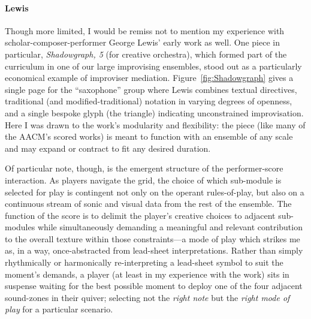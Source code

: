     \paragraph{Lewis}
        
    Though more limited, I would be remiss not to mention my experience with scholar-composer-performer George Lewis' early work as well. One piece in particular, \textit{Shadowgraph, 5} (for creative orchestra), which formed part of the curriculum in one of our large improvising ensembles, stood out as a particularly economical example of improviser mediation. Figure~\ref{fig:Shadowgraph} gives a single page for the ``saxophone'' group where Lewis combines textual directives, traditional (and modified-traditional) notation in varying degrees of openness, and a single bespoke glyph (the triangle) indicating unconstrained improvisation. Here I was drawn to the work's modularity and flexibility: the piece (like many of the AACM's scored works) is meant to function with an ensemble of any scale and may expand or contract to fit any desired duration. 
    
    Of particular note, though, is the emergent structure of the performer-score interaction. As players navigate the grid, the choice of which sub-module is selected for play is contingent not only on the operant rules-of-play, but also on a continuous stream of sonic and visual data from the rest of the ensemble. The function of the score is to delimit the player's creative choices to adjacent sub-modules while simultaneously demanding a meaningful and relevant contribution to the overall texture within those constraints---a mode of play which strikes me as, in a way, once-abstracted from lead-sheet interpretations. Rather than simply rhythmically or harmonically re-interpreting a lead-sheet symbol to suit the moment's demands, a player (at least in my experience with the work) sits in suspense waiting for the best possible moment to deploy one of the four adjacent sound-zones in their quiver; selecting not the \textit{right note} but the \textit{right mode of play} for a particular scenario. 

